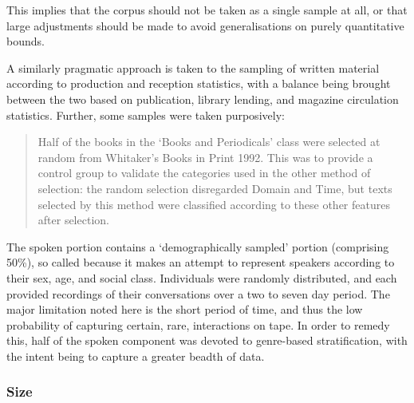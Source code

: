 This implies that the corpus should not be taken as a single sample at all, or that large adjustments should be made to avoid generalisations on purely quantitative bounds.

A similarly pragmatic approach is taken to the sampling of written material according to production and reception statistics, with a balance being brought between the two based on publication, library lending, and magazine circulation statistics.  Further, some samples were taken purposively:

\begin{quote}
Half of the books in the ‘Books and Periodicals’ class were selected at random from Whitaker's Books in Print 1992. This was to provide a control group to validate the categories used in the other method of selection:  the random selection disregarded Domain and Time, but texts selected by this method were classified according to these other features after selection.
\end{quote}

The spoken portion contains a `demographically sampled' portion (comprising 50\%), so called because it makes an attempt to represent speakers according to their sex, age, and social class.  Individuals were randomly distributed, and each provided recordings of their conversations over a two to seven day period.  The major limitation noted here is the short period of time, and thus the low probability of capturing certain, rare, interactions on tape.  In order to remedy this, half of the spoken component was devoted to genre-based stratification, with the intent being to capture a greater beadth of data.












\subsubsection{Size}

